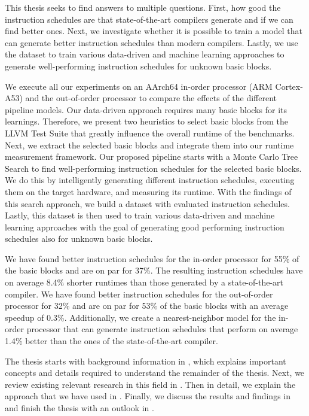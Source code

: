 This thesis seeks to find answers to multiple questions.
First, how good the instruction schedules are that state-of-the-art compilers generate and if we can find better ones.
Next, we investigate whether it is possible to train a model that can generate better instruction schedules than modern compilers.
Lastly, we use the dataset to train various data-driven and machine learning approaches to generate well-performing instruction schedules for unknown basic blocks.


We execute all our experiments on an AArch64 in-order processor (ARM Cortex-A53) and the \auroralong{} out-of-order processor to compare the effects of the different pipeline models.
Our data-driven approach requires many basic blocks for its learnings.
Therefore, we present two heuristics to select basic blocks from the LLVM Test Suite that greatly influence the overall runtime of the benchmarks.
Next, we extract the selected basic blocks and integrate them into our runtime measurement framework.
Our proposed pipeline starts with a Monte Carlo Tree Search to find well-performing instruction schedules for the selected basic blocks.
We do this by intelligently generating different instruction schedules, executing them on the target hardware, and measuring its runtime.
With the findings of this search approach, we build a dataset with evaluated instruction schedules.
Lastly, this dataset is then used to train various data-driven and machine learning approaches with the goal of generating good performing instruction schedules also for unknown basic blocks.

We have found better instruction schedules for the in-order processor for 55\% of the basic blocks and are on par for 37\%.
The resulting instruction schedules have on average 8.4\% shorter runtimes than those generated by a state-of-the-art compiler.
We have found better instruction schedules for the out-of-order processor for 32\% and are on par for 53\% of the basic blocks with an average speedup of 0.3\%.
Additionally, we create a nearest-neighbor model for the in-order processor that can generate instruction schedules that perform on average 1.4\% better than the ones of the state-of-the-art compiler.

The thesis starts with background information in , which explains important concepts and details required to understand the remainder of the thesis.
Next, we review existing relevant research in this field in .
Then in detail, we explain the approach that we have used in .
Finally, we discuss the results and findings in  and finish the thesis with an outlook in .
